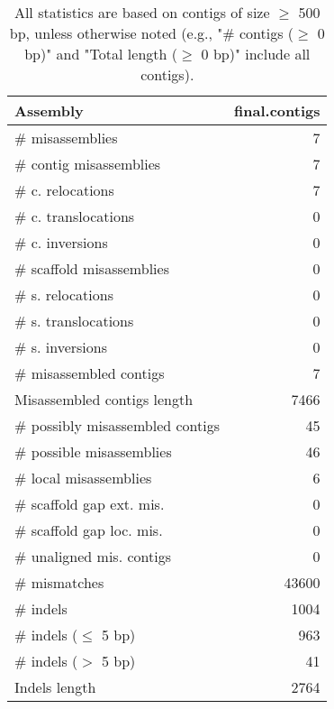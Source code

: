 \documentclass[12pt,a4paper]{article}
\begin{document}
\begin{table}[ht]
\begin{center}
\caption{All statistics are based on contigs of size $\geq$ 500 bp, unless otherwise noted (e.g., "\# contigs ($\geq$ 0 bp)" and "Total length ($\geq$ 0 bp)" include all contigs).}
\begin{tabular}{|l*{1}{|r}|}
\hline
Assembly & final.contigs \\ \hline
\# misassemblies & 7 \\ \hline
\hspace{2mm}\# contig misassemblies & 7 \\ \hline
\hspace{5mm}\# c. relocations & 7 \\ \hline
\hspace{5mm}\# c. translocations & 0 \\ \hline
\hspace{5mm}\# c. inversions & 0 \\ \hline
\hspace{2mm}\# scaffold misassemblies & 0 \\ \hline
\hspace{5mm}\# s. relocations & 0 \\ \hline
\hspace{5mm}\# s. translocations & 0 \\ \hline
\hspace{5mm}\# s. inversions & 0 \\ \hline
\# misassembled contigs & 7 \\ \hline
Misassembled contigs length & 7466 \\ \hline
\# possibly misassembled contigs & 45 \\ \hline
\hspace{5mm}\# possible misassemblies & 46 \\ \hline
\# local misassemblies & 6 \\ \hline
\# scaffold gap ext. mis. & 0 \\ \hline
\# scaffold gap loc. mis. & 0 \\ \hline
\# unaligned mis. contigs & 0 \\ \hline
\# mismatches & 43600 \\ \hline
\# indels & 1004 \\ \hline
\hspace{5mm}\# indels ($\leq$ 5 bp) & 963 \\ \hline
\hspace{5mm}\# indels ($>$ 5 bp) & 41 \\ \hline
Indels length & 2764 \\ \hline
\end{tabular}
\end{center}
\end{table}
\end{document}
